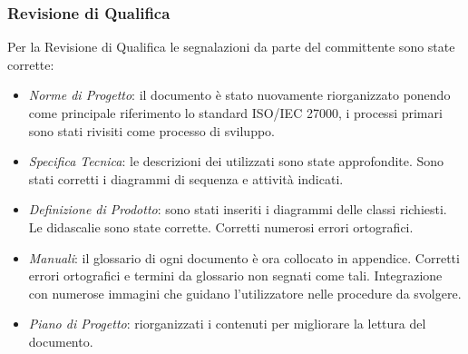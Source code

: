 		\subsubsection{Revisione di Qualifica}
		
		Per la Revisione di Qualifica le segnalazioni da parte del committente sono state corrette:
		
		\begin{itemize}
			\item \emph{Norme di Progetto}: il documento è stato nuovamente riorganizzato ponendo come principale riferimento lo standard ISO/IEC 27000, i processi primari sono stati rivisiti come processo di sviluppo.
			\item \emph{Specifica Tecnica}: le descrizioni dei  utilizzati sono state approfondite. Sono stati corretti i diagrammi di sequenza e attività indicati.
			\item \emph{Definizione di Prodotto}: sono stati inseriti i diagrammi delle classi richiesti. Le didascalie sono state corrette. Corretti numerosi errori ortografici.
			\item \emph{Manuali}: il glossario di ogni documento è ora collocato in appendice. Corretti errori ortografici e termini da glossario non segnati come tali. Integrazione con numerose immagini che guidano l'utilizzatore nelle procedure da svolgere.
			\item \emph{Piano di Progetto}: riorganizzati i contenuti per migliorare la lettura del documento. 
		\end{itemize}


	
